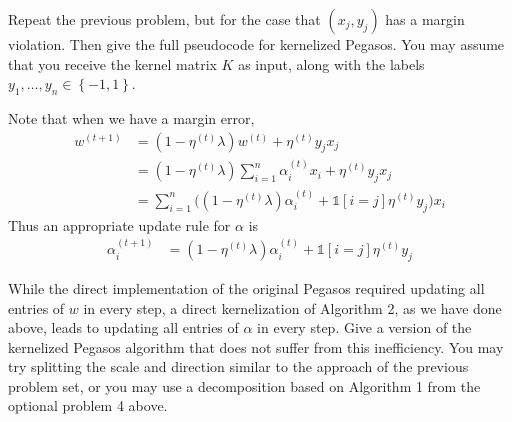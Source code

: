 \documentclass[12pt,letterpaper]{article}
\begin{document}
\begin{problem}{5.3}
Repeat the previous problem, but for the case that $\left(x_{j},y_{j}\right)$
has a margin violation. Then give the full pseudocode for kernelized
Pegasos. You may assume that you receive the kernel matrix $K$ as
input, along with the labels $y_{1},\ldots,y_{n}\in\left\{ -1,1\right\}$.
\end{problem}
\begin{solution}{}
    Note that when we have a margin error,
    \begin{align*}
        w^{(t+1)} &= (1-\eta^{(t)}\lambda)w^{(t)} + \eta^{(t)}y_jx_j\\
        &= (1-\eta^{(t)}\lambda)\sum_{i=1}^{n}\alpha_{i}^{(t)}x_{i} + \eta^{(t)}y_jx_j\\
        &= \sum_{i=1}^{n} \big( (1-\eta^{(t)}\lambda)\alpha_{i}^{(t)} +  \mathds{1}[i=j]\eta^{(t)}y_j \big) x_i
    \end{align*}
    Thus an appropriate update rule for $\alpha$ is 
    \begin{align*}
        \alpha_i^{(t+1)} &= (1-\eta^{(t)}\lambda)\alpha_{i}^{(t)} +  \mathds{1}[i=j]\eta^{(t)}y_j
    \end{align*}
\end{solution}
\newpage

\begin{problem}{5.4}
While the direct implementation of the original Pegasos
required updating all entries of $w$ in every step, a direct kernelization
of Algorithm 2, as we have done above,
leads to updating all entries of $\alpha$ in every step. Give a version
of the kernelized Pegasos algorithm that does not suffer from this
inefficiency. You may try splitting the scale and direction similar
to the approach of the previous problem set, or you may use a decomposition
based on Algorithm 1 from the optional
problem 4 above.
\end{problem}
\begin{solution}{}
    
\end{solution}
\newpage


\end{document}
